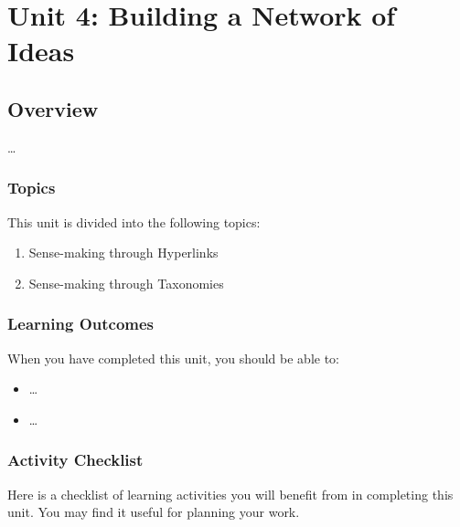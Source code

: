 \documentclass[
]{book}
\providecommand{\tightlist}{%
  \setlength{\itemsep}{0pt}\setlength{\parskip}{0pt}}
\theoremstyle{definition}
\theoremstyle{definition}
\theoremstyle{definition}
\theoremstyle{definition}
\theoremstyle{remark}
\begin{document}
\hypertarget{unit-4-building-a-network-of-ideas}{%
\chapter{Unit 4: Building a Network of Ideas}\label{unit-4-building-a-network-of-ideas}}

\hypertarget{overview-3}{%
\section*{Overview}\label{overview-3}}

\ldots{}

\hypertarget{topics-3}{%
\subsection*{Topics}\label{topics-3}}

This unit is divided into the following topics:

\begin{enumerate}
\def\labelenumi{\arabic{enumi}.}
\tightlist
\item
  Sense-making through Hyperlinks
\item
  Sense-making through Taxonomies
\end{enumerate}

\hypertarget{learning-outcomes-3}{%
\subsection*{Learning Outcomes}\label{learning-outcomes-3}}

When you have completed this unit, you should be able to:

\begin{itemize}
\tightlist
\item
  \ldots{}
\item
  \ldots{}
\end{itemize}

\hypertarget{activity-checklist-3}{%
\subsection*{Activity Checklist}\label{activity-checklist-3}}

Here is a checklist of learning activities you will benefit from in completing this unit. You may find it useful for planning your work.
\end{document}
